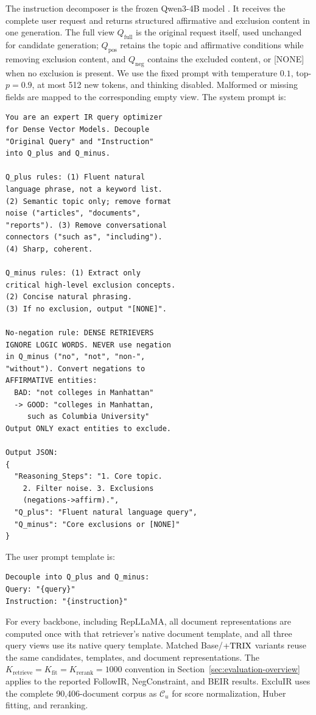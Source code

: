 \documentclass[letterpaper]{article}
\newcommand{\method}{\ifmmode \mathrm{TRIX}\else TRIX\xspace\fi}
\newcommand{\qbase}{Q_{\text{full}}}
\newcommand{\qpos}{Q_{\text{pos}}}
\newcommand{\qneg}{Q_{\text{neg}}}
\begin{document}
The instruction decomposer is the frozen Qwen3-4B model
\cite{yang2025qwen3}.  It receives the complete user request and returns
structured affirmative and exclusion content in one generation.  The full
view $\qbase$ is the original request itself, used unchanged for candidate
generation; $\qpos$ retains the topic and affirmative conditions while removing
exclusion content, and $\qneg$ contains the excluded content, or
\textnormal{[NONE]} when no exclusion is present.  We use the fixed prompt with temperature $0.1$, top-$p=0.9$, at most
512 new tokens, and thinking disabled.  Malformed or missing fields are mapped
to the corresponding empty view.  The system prompt is:
{\footnotesize
\begin{verbatim}
You are an expert IR query optimizer
for Dense Vector Models. Decouple
"Original Query" and "Instruction"
into Q_plus and Q_minus.

Q_plus rules: (1) Fluent natural
language phrase, not a keyword list.
(2) Semantic topic only; remove format
noise ("articles", "documents",
"reports"). (3) Remove conversational
connectors ("such as", "including").
(4) Sharp, coherent.

Q_minus rules: (1) Extract only
critical high-level exclusion concepts.
(2) Concise natural phrasing.
(3) If no exclusion, output "[NONE]".

No-negation rule: DENSE RETRIEVERS
IGNORE LOGIC WORDS. NEVER use negation
in Q_minus ("no", "not", "non-",
"without"). Convert negations to
AFFIRMATIVE entities:
  BAD: "not colleges in Manhattan"
  -> GOOD: "colleges in Manhattan,
     such as Columbia University"
Output ONLY exact entities to exclude.

Output JSON:
{
  "Reasoning_Steps": "1. Core topic.
    2. Filter noise. 3. Exclusions
    (negations->affirm).",
  "Q_plus": "Fluent natural language query",
  "Q_minus": "Core exclusions or [NONE]"
}
\end{verbatim}
}
The user prompt template is:
{\footnotesize
\begin{verbatim}
Decouple into Q_plus and Q_minus:
Query: "{query}"
Instruction: "{instruction}"
\end{verbatim}
}

For every backbone, including RepLLaMA, all document representations are
computed once with that retriever's native document template, and all three
query views use its native query template.  Matched Base/$+\method$ variants
reuse the same candidates, templates, and document representations.  The
$K_{\mathrm{retrieve}}=K_{\mathrm{fit}}=K_{\mathrm{rerank}}=1000$ convention
in Section~\ref{sec:evaluation-overview} applies to the reported FollowIR,
NegConstraint, and BEIR results.  ExcluIR uses the complete 90,406-document
corpus as $\mathcal C_u$ for score normalization, Huber fitting, and reranking.
\end{document}
